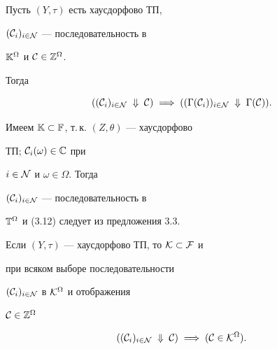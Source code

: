 \begin{props}


Пусть $(Y,\tau)$ есть хаусдорфово ТП,


$({\cal C}_i)_{i \in {\cal N}}$ --- последовательность в


${\Bbb K}^{\Omega}$ и ${\cal C} \in {{\Bbb Z}^{\Omega}}$.


Тогда


\begin{equation}


(({\cal C}_i)_{i \in {\cal N}}\;\Downarrow\;{\cal C})\;\Longrightarrow\;


(({{\Gamma}({\cal C}_i)})_{i \in {\cal N}}\;\Downarrow\;{\Gamma}({\cal C})).


\end{equation}


\end{props}





\begin{pf}


Имеем ${\Bbb K} \subset {\Bbb F}$, т.\,к. $(Z,\theta)$ --- хаусдорфово


ТП; ${{\cal C}_i}(\omega) \in {\Bbb C}$ при


$i \in {\cal N}$ и $\omega \in \Omega$. Тогда


$({\cal C}_i)_{i \in {\cal N}}$ --- последовательность в


${\Bbb T}^{\Omega}$ и (3.12) следует из предложения 3.3.


\end{pf}





Если $(Y,\tau)$ --- хаусдорфово ТП, то ${\cal K} \subset {\cal F}$ и


при всяком выборе последовательности


$({\cal C}_i)_{i \in {\cal N}}$ в ${\cal K}^{\Omega}$ и отображения


${\cal C} \in {{\Bbb Z}^{\Omega}}$


\begin{equation}


(({\cal C}_i)_{i \in {\cal N}}\;\Downarrow\;{\cal C})\;


\Longrightarrow\;({\cal C} \in {{\cal K}^{\Omega}}).


\end{equation}






